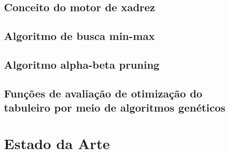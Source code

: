 \subsection{Conceito do motor de xadrez}

\subsection{Algoritmo de busca min-max}

\subsection{Algoritmo alpha-beta pruning}

\subsection{Funções de avaliação de otimização do tabuleiro por meio de algoritmos genéticos}

\section{Estado da Arte}
